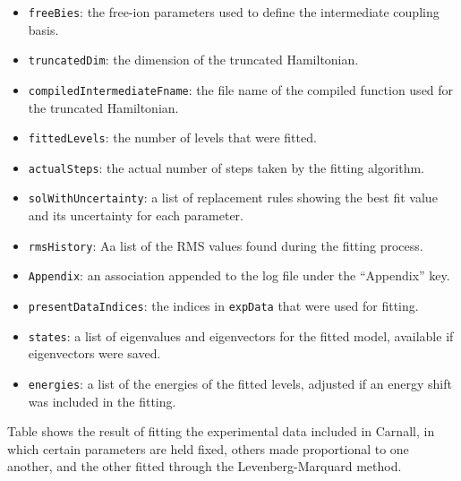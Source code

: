 \documentclass{article}
\newcommand{\codetext}[1]{{\color{BlueViolet} \texttt{#1}}}
\begin{document}
\begin{itemize}
    \item \codetext{freeBies}: the free-ion parameters used to define the intermediate coupling basis.

    \item \codetext{truncatedDim}: the dimension of the truncated Hamiltonian.

    \item \codetext{compiledIntermediateFname}: the file name of the compiled function used for the truncated Hamiltonian.
 
    \item \codetext{fittedLevels}: the number of levels that were fitted.

    \item \codetext{actualSteps}: the actual number of steps taken by the fitting algorithm.

    \item \codetext{solWithUncertainty}: a list of replacement rules showing the best fit value and its uncertainty for each parameter.

    \item \codetext{rmsHistory}: Aa list of the RMS values found during the fitting process.

    \item \codetext{Appendix}: an association appended to the log file under the ``Appendix'' key.

    \item \codetext{presentDataIndices}: the indices in \codetext{expData} that were used for fitting.

    \item \codetext{states}: a list of eigenvalues and eigenvectors for the fitted model, available if eigenvectors were saved.

    \item \codetext{energies}: a list of the energies of the fitted levels, adjusted if an energy shift was included in the fitting.
\end{itemize}

Table  shows the result of fitting the experimental data included in Carnall, in which certain parameters are held fixed, others made proportional to one another, and the other fitted through the Levenberg-Marquard method.
\end{document}
